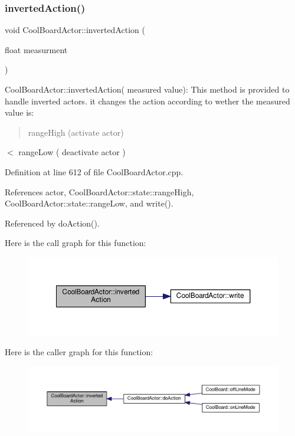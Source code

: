 \subsubsection{\texorpdfstring{inverted\+Action()}{invertedAction()}}
{\footnotesize\ttfamily void Cool\+Board\+Actor\+::inverted\+Action (\begin{DoxyParamCaption}\item[{float}]{measurment }\end{DoxyParamCaption})}

Cool\+Board\+Actor\+::inverted\+Action( measured value)\+: This method is provided to handle inverted actors. it changes the action according to wether the measured value is\+: \begin{quote}
range\+High (activate actor) \end{quote}
$<$ range\+Low ( deactivate actor ) 

Definition at line 612 of file Cool\+Board\+Actor.\+cpp.



References actor, Cool\+Board\+Actor\+::state\+::range\+High, Cool\+Board\+Actor\+::state\+::range\+Low, and write().



Referenced by do\+Action().

Here is the call graph for this function\+:\nopagebreak
\begin{figure}[H]
\begin{center}
\leavevmode
\includegraphics[width=350pt]{dc/d69/class_cool_board_actor_aae82b2e62f91be009d40f93c206f9bda_cgraph}
\end{center}
\end{figure}
Here is the caller graph for this function\+:\nopagebreak
\begin{figure}[H]
\begin{center}
\leavevmode
\includegraphics[width=350pt]{dc/d69/class_cool_board_actor_aae82b2e62f91be009d40f93c206f9bda_icgraph}
\end{center}
\end{figure}
\mbox{\label{class_cool_board_actor_a02698bd647df49cabbe74513d4d88918}} 
